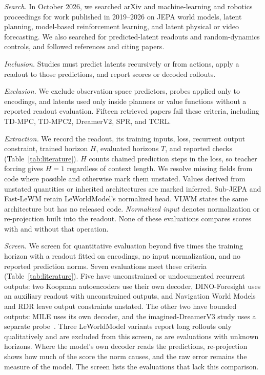 \emph{Search.} In October 2026, we searched arXiv and machine-learning and robotics proceedings for work published in 2019--2026 on JEPA world models, latent planning, model-based reinforcement learning, and latent physical or video forecasting. We also searched for predicted-latent readouts and random-dynamics controls, and followed references and citing papers.

\emph{Inclusion.} Studies must predict latents recursively or from actions, apply a readout to those predictions, and report scores or decoded rollouts.

\emph{Exclusion.} We exclude observation-space predictors, probes applied only to encodings, and latents used only inside planners or value functions without a reported readout evaluation. Fifteen retrieved papers fail these criteria, including TD-MPC, TD-MPC2, DreamerV2, SPR, and TCRL.

\emph{Extraction.} We record the readout, its training inputs, loss, recurrent output constraint, trained horizon $H$, evaluated horizons $T$, and reported checks (Table~\ref{tab:literature}). $H$ counts chained prediction steps in the loss, so teacher forcing gives $H=1$ regardless of context length. We resolve missing fields from code where possible and otherwise mark them unstated. Values derived from unstated quantities or inherited architectures are marked inferred. Sub-JEPA and Fast-LeWM retain LeWorldModel's normalized head. VLWM states the same architecture but has no released code. \emph{Normalized input} denotes normalization or re-projection built into the readout. None of these evaluations compares scores with and without that operation.

\emph{Screen.}
We screen for quantitative evaluation beyond five times the training horizon with a readout fitted on encodings, no input normalization, and no reported prediction norms. Seven evaluations meet these criteria (Table~\ref{tab:literature}). Five have unconstrained or undocumented recurrent outputs: two Koopman autoencoders use their own decoder, DINO-Foresight uses an auxiliary readout with unconstrained outputs, and Navigation World Models and RDR leave output constraints unstated. The other two have bounded outputs: MILE uses its own decoder, and the imagined-DreamerV3 study uses a separate probe~\citep{schafer2026imagined}. Three LeWorldModel variants report long rollouts only qualitatively and are excluded from this screen, as are evaluations with unknown horizons. Where the model's own decoder reads the predictions, re-projection shows how much of the score the norm causes, and the raw error remains the measure of the model. The screen lists the evaluations that lack this comparison.


